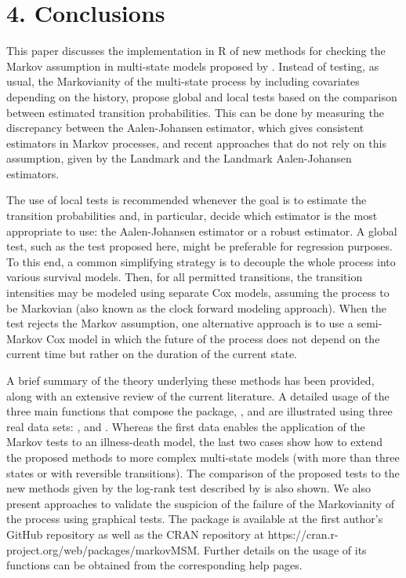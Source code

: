 \section{4. Conclusions} \label{sec:conc}
This paper discusses the implementation in R of new methods for checking the Markov assumption in multi-state models proposed by \cite{soutinho_machado2020}. Instead of testing, as usual, the Markovianity of the multi-state process by including covariates depending on the history, \cite{soutinho_machado2020} propose global and local tests based on the comparison between estimated transition probabilities. This can be done by measuring the discrepancy between the Aalen-Johansen estimator, which gives consistent estimators in Markov processes, and recent approaches that do not rely on this assumption, given by the Landmark and the Landmark Aalen-Johansen estimators. 

The use of local tests is recommended whenever the goal is to estimate the transition probabilities and, in particular, decide which estimator is the most appropriate to use: the Aalen-Johansen estimator or a robust estimator. A global test, such as the test proposed here, might be preferable for regression purposes. To this end, a common simplifying strategy is to decouple the whole process into various survival models. Then, for all permitted transitions, the transition intensities may be modeled using separate Cox models, assuming the process to be Markovian (also known as the clock forward modeling approach). When the test rejects the Markov assumption, one alternative approach is to use a semi-Markov Cox model in which the future of the process does not depend on the current time but rather on the duration of the current state.

A brief summary of the theory underlying these methods has been provided, along with an extensive review of the current literature. A detailed usage of the three main functions that compose the  package, ,  and  are illustrated using three real data sets: ,  and . Whereas the first data enables the application of the Markov tests to an illness-death model, the last two cases show how to extend the proposed methods to more complex multi-state models (with more than three states or with reversible transitions). The comparison of the proposed tests to the new methods given by the log-rank test described by \cite{Titman2020} is also shown. We also present approaches to validate the suspicion of the failure of the Markovianity of the process using graphical tests. The  package is available at the first author's GitHub repository as well as the CRAN repository at https://cran.r-project.org/web/packages/markovMSM. Further details on the usage of its functions can be obtained from the corresponding help pages.


